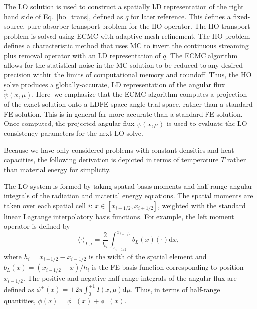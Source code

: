 \documentclass{mc2013}
\renewcommand{\d}{\mathrm{d}}
\newcommand{\mom}[1]{\langle #1 \rangle}
\newcommand{\xr}{{x_{i+1/2}}}
\begin{document}
The LO solution is used to construct a spatially LD representation of the right
hand side of Eq.~\eqref{ho_trans}, defined as  $q$ for later reference.  This defines a fixed-source, pure absorber
transport problem for the HO operator.  The HO transport problem is solved using ECMC with adaptive mesh
refinement.  The HO problem defines a characteristic method that uses MC to
invert the continuous streaming plus removal operator with an LD representation of $q$.  The ECMC algorithm allows for the statistical noise in the MC
solution to be reduced to any desired precision within the limits of computational memory and
roundoff.  Thus, the HO solve produces a
globally-accurate, LD representation of the angular flux
$\tilde{\psi}(x,\mu)$.  Here, we emphasize that the ECMC algorithm computes a
projection of the exact solution onto a LDFE space-angle trial space, rather than a
standard FE solution.  This is in general far
more accurate than a standard FE solution.  Once computed, the projected
angular flux $\tilde{\psi}(x,\mu)$ is used to evaluate the LO
consistency parameters for the next LO solve.  

Because we have only considered problems with constant densities and heat capacities, the following
derivation is depicted in terms of temperature $T$ rather than material energy
for simplicity.  




The LO system is formed by taking spatial basis moments and half-range angular
integrals of the radiation and material energy equations.  The spatial moments are taken over each spatial cell $i$:
$x\in[x_{i-1/2},x_{i+1/2}]$, weighted with the standard linear Lagrange
interpolatory basis functions.  For example, the left moment operator is defined by
\begin{equation}\label{x_mom}
\mom{\cdot}_{L,i} = \frac{2}{h_i} \int_{x_{i-1/2}}^{\xr} b_L(x) (\cdot) \d x,
\end{equation}
where $h_i=x_{i+1/2}-x_{i-1/2}$ is the width of the spatial element and
$b_L(x)=(x_{i+1/2}-x)/h_i$ is the FE basis function corresponding to position
$x_{i-1/2}$. The positive and negative half-range integrals of the angular flux are defined as
$ \phi^\pm(x) = \pm2\pi \int_0^{\pm 1} I(x,\mu) \d \mu$.
Thus, in terms of half-range quantities, $\phi(x) = \phi^-(x) + \phi ^+(x)$.  
\end{document}
